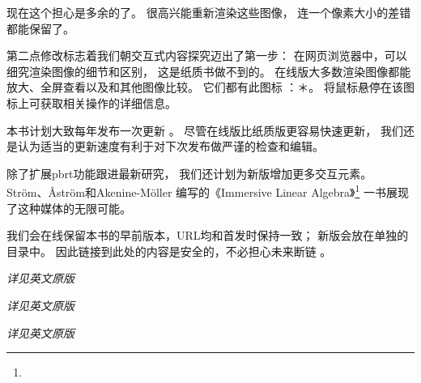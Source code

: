 现在这个担心是多余的了。
很高兴能重新渲染这些图像，
连一个像素大小的差错都能保留了。

第二点修改标志着我们朝交互式内容探究迈出了第一步：
在网页浏览器中，可以细究渲染图像的细节和区别，
这是纸质书做不到的。
在线版大多数渲染图像都能放大、全屏查看以及和其他图像比较。
它们都有此图标
：＊。
将鼠标悬停在该图标上可获取相关操作的详细信息。\\


本书计划大致每年发布一次更新
。
尽管在线版比纸质版更容易快速更新，
我们还是认为适当的更新速度有利于对下次发布做严谨的检查和编辑。

除了扩展pbrt功能跟进最新研究，
我们还计划为新版增加更多交互元素。
Str{\"o}m、{\AA}str{\"o}m和Akenine-M{\"o}ller
编写的《Immersive Linear Algebra》\footnote{}
一书展现了这种媒体的无限可能。

我们会在线保留本书的早前版本，URL均和首发时保持一致；
新版会放在单独的目录中。
因此链接到此处的内容是安全的，不必担心未来断链
。\\


{\itshape 详见英文原版}\\


{\itshape 详见英文原版}\\


{\itshape 详见英文原版}